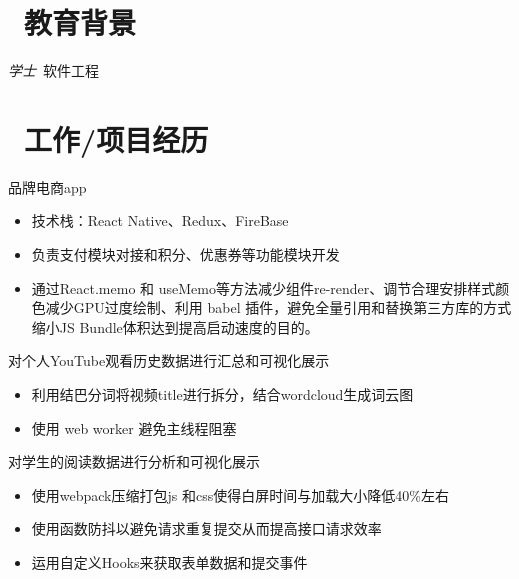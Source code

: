 \documentclass{resume}
\begin{document}


 
\section{\faGraduationCap\  教育背景}
\textit{学士}\ 软件工程

\section{\faUsers\ 工作/项目经历}
\role{工作}{前端***}
品牌电商app
\begin{itemize}
  \item 技术栈：React Native、Redux、FireBase 
  \item 负责支付模块对接和积分、优惠券等功能模块开发
  \item 通过React.memo 和 useMemo等方法减少组件re-render、调节合理安排样式颜色减少GPU过度绘制、利用 babel 插件，避免全量引用和替换第三方库的方式缩小JS Bundle体积达到提高启动速度的目的。
\end{itemize}

\begin{onehalfspacing}
对个人YouTube观看历史数据进行汇总和可视化展示
\begin{itemize}
  \item 利用结巴分词将视频title进行拆分，结合wordcloud生成词云图
  \item 使用 web worker 避免主线程阻塞
\end{itemize}
\end{onehalfspacing}

\begin{onehalfspacing}
对学生的阅读数据进行分析和可视化展示
\begin{itemize}
  \item 使⽤webpack压缩打包js 和css使得⽩屏时间与加载⼤⼩降低40\%左右
  \item 使⽤函数防抖以避免请求重复提交从⽽提⾼接⼝请求效率
  \item 运⽤⾃定义Hooks来获取表单数据和提交事件
\end{itemize}
\end{onehalfspacing}
\end{document}
